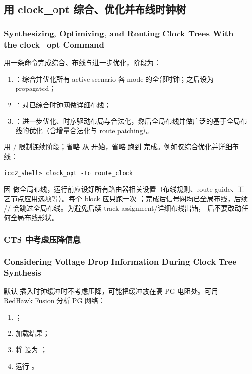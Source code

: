 \subsection{用 clock\_opt 综合、优化并布线时钟树}
\subsubsection*{Synthesizing, Optimizing, and Routing Clock Trees With the clock\_opt Command}

 用一条命令完成综合、布线与进一步优化，阶段为：
\begin{enumerate}
  \item {}：综合并优化所有 active scenario 各 mode 的全部时钟；之后设为 propagated；
  \item {}：对已综合时钟网做详细布线；
  \item {}：进一步优化、时序驱动布局与合法化，然后全局布线并做广泛的基于全局布线的优化（含增量合法化与 route patching）。
\end{enumerate}
用 / 限制连续阶段；省略  从  开始，省略  跑到  完成。例如仅综合优化并详细布线：
\begin{lstlisting}
icc2_shell> clock_opt -to route_clock
\end{lstlisting}

因  做全局布线，运行前应设好所有路由器相关设置（布线规则、route guide、工艺节点应用选项等）。每个 block 应只跑一次 ；完成后信号网均已全局布线，后续 // 会跳过全局布线。为避免后续 track assignment/详细布线出错， 后不要改动任何全局布线形状。

\subsubsection{CTS 中考虑压降信息}
\subsubsection*{Considering Voltage Drop Information During Clock Tree Synthesis}

默认  插入时钟缓冲时不考虑压降，可能把缓冲放在高 PG 电阻处。可用 RedHawk Fusion 分析 PG 网络：
\begin{enumerate}
  \item {}；
  \item {} 加载结果；
  \item 将  设为 ；
  \item 运行 。
\end{enumerate}

